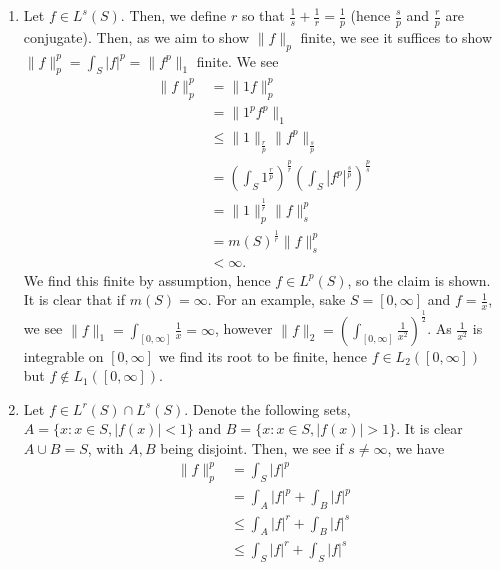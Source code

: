 \documentclass[a4paper]{article}
\begin{document}
\begin{problem}[42]
\begin{enumerate}
	\item Let \(f \in L^{s}\left( S \right) \). Then, we define \(r\) so that \(\frac{1}{s} + \frac{1}{r} = \frac{1}{p}\) (hence \(\frac{s}{p}\) and \(\frac{r}{p}\) are conjugate). Then, as we aim to show \(\|f\|_{p}\) finite, we see it suffices to show \(\|f\|_{p}^{p} = \int_{S} \left| f \right| ^{p} = \| f^{p}\|_{1}\) finite. We see
		\begin{align*}
			\|f\|_{p}^{p} &= \| 1f\|_{p}^{p}\\
&= \| 1^{p} f^{p}\|_{1} \\
&\le \|1\|_{\frac{r}{p}} \|f^{p}\|_{\frac{s}{p}}\\
&= (\int_{S} 1^{\frac{r}{p}} )^{\frac{p}{r}} \left( \int_{S} \left| f^{p} \right| ^{\frac{s}{p}} \right) ^{\frac{p}{s}}  \\
&= \|1\|^{\frac{1}{r}}_{p} \|f\|_{s}^{p}\\
&= m\left( S \right) ^{\frac{1}{r}} \|f\|_{s}^{p} \\
&< \infty
		.\end{align*}
		We find this finite by assumption, hence \(f \in L^{p}\left( S \right) \), so the claim is shown. It is clear that if \(m\left( S \right) = \infty\). For an example, sake \(S = \left[ 0, \infty \right] \) and \(f = \frac{1}{x}\), we see \(\|f\|_{1} = \int_{\left[ 0, \infty \right] } \frac{1}{x} = \infty\), however \(\|f\|_{2} = (\int_{\left[ 0, \infty \right] } \frac{1}{x^2})^{\frac{1}{2}}\). As \(\frac{1}{x^2}\) is integrable on \(\left[ 0, \infty \right] \) we find its root to be finite, hence \(f \in L_2\left( \left[ 0, \infty \right]  \right) \) but \(f \not\in L_1\left( \left[ 0, \infty \right]  \right) \).
	\item Let \(f \in L^{r}\left( S \right) \cap L^{s}\left( S \right) \). Denote the following sets, \(A = \{x  : x \in S, \left| f\left( x \right)  \right| < 1\} \) and \(B = \{x : x \in S, \left| f\left( x \right)  \right| > 1\} \). It is clear \(A \cup B = S\), with \(A, B\) being disjoint. Then, we see if \(s \neq \infty\), we have
		\begin{align*}
			\|f\|_{p}^{p} &= \int_{S} \left| f \right| ^{p}\\
			&= \int_{A} \left| f \right| ^{p} + \int_{B} \left| f \right| ^{p} \\
			&\le \int_{A} \left| f \right| ^{r} + \int_{B} \left| f \right| ^{s} \\
			&\le \int_{S} \left| f \right| ^{r} + \int_{S} \left| f \right| ^{s}\\

\end{align*}
\end{enumerate}
\end{problem}
\end{document}
